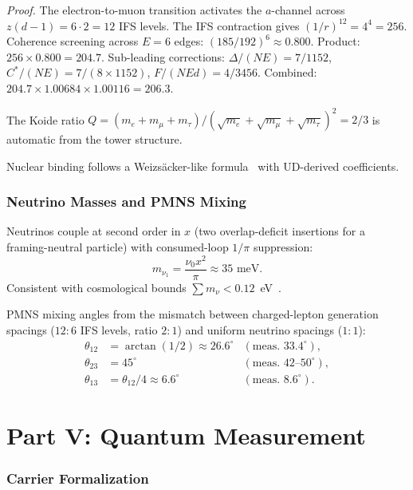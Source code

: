 \documentclass[11pt,twocolumn]{article}
\begin{document}
\textit{Proof.}
The electron-to-muon transition activates the $a$-channel across $z(d{-}1)=6\cdot 2=12$ IFS levels.
The IFS contraction gives $(1/r)^{12}=4^4=256$.
Coherence screening across $E=6$ edges: $(185/192)^6\approx 0.800$.
Product: $256\times 0.800=204.7$.
Sub-leading corrections: $\Delta/(NE)=7/1152$, $C^*/(NE)=7/(8\times 1152)$, $F/(NEd)=4/3456$.
Combined: $204.7\times 1.00684\times 1.00116=206.3$.

The Koide ratio $Q=(m_e+m_\mu+m_\tau)/(\sqrt{m_e}+\sqrt{m_\mu}+\sqrt{m_\tau})^2=2/3$ is automatic from the tower structure.

Nuclear binding follows a Weizs\"acker-like formula~\cite{weizsacker1935} with UD-derived coefficients.

\section{Neutrino Masses and PMNS Mixing}
\label{sec:neutrino}

Neutrinos couple at second order in $x$ (two overlap-deficit insertions for a framing-neutral particle) with consumed-loop $1/\pi$ suppression:
\begin{equation}
m_{\nu_1}=\frac{\nu_0 x^2}{\pi}\approx 35\text{ meV}.
\label{eq:neutrino}
\end{equation}
Consistent with cosmological bounds $\sum m_\nu<0.12$~eV~\cite{planck2018}.

PMNS mixing angles from the mismatch between charged-lepton generation spacings ($12:6$ IFS levels, ratio $2:1$) and uniform neutrino spacings ($1:1$):
\begin{align}
\theta_{12}&=\arctan(1/2)\approx 26.6^\circ &(\text{meas.\ }33.4^\circ),\label{eq:t12}\\
\theta_{23}&=45^\circ &(\text{meas.\ }42\text{--}50^\circ),\label{eq:t23}\\
\theta_{13}&=\theta_{12}/4\approx 6.6^\circ &(\text{meas.\ }8.6^\circ).\label{eq:t13}
\end{align}


\part*{Part V: Quantum Measurement}

\section{Carrier Formalization}
\label{sec:carrier}
\end{document}
